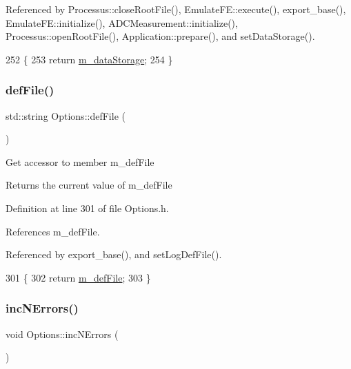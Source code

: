 Referenced by Processus\+::close\+Root\+File(), Emulate\+F\+E\+::execute(), export\+\_\+base(), Emulate\+F\+E\+::initialize(), A\+D\+C\+Measurement\+::initialize(), Processus\+::open\+Root\+File(), Application\+::prepare(), and set\+Data\+Storage().


\begin{DoxyCode}
252                             \{
253                 \textcolor{keywordflow}{return} \hyperlink{classOptions_a244898bb30c9f716bdc335b4d85d1dfb}{m\_dataStorage};
254         \}
\end{DoxyCode}
\mbox{\label{classOptions_aca5ce5262ca717eaad5ff9db92ad1948}} 
\subsubsection{\texorpdfstring{def\+File()}{defFile()}}
{\footnotesize\ttfamily std\+::string Options\+::def\+File (\begin{DoxyParamCaption}{ }\end{DoxyParamCaption})\hspace{0.3cm}{\ttfamily [inline]}}

Get accessor to member m\+\_\+def\+File \begin{DoxyReturn}{Returns}
the current value of m\+\_\+def\+File 
\end{DoxyReturn}


Definition at line 301 of file Options.\+h.



References m\+\_\+def\+File.



Referenced by export\+\_\+base(), and set\+Log\+Def\+File().


\begin{DoxyCode}
301                              \{
302                 \textcolor{keywordflow}{return} \hyperlink{classOptions_a59ff5f2cab2490fb529367de13a2321a}{m\_defFile};
303         \}
\end{DoxyCode}
\mbox{\label{classOptions_ae5d12fb2571255033ef6b35300921b39}} 
\subsubsection{\texorpdfstring{inc\+N\+Errors()}{incNErrors()}}
{\footnotesize\ttfamily void Options\+::inc\+N\+Errors (\begin{DoxyParamCaption}{ }\end{DoxyParamCaption})\hspace{0.3cm}{\ttfamily [inline]}}

